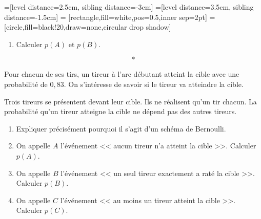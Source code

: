 \documentclass[10pt,french]{book}
\begin{document}
=[level distance=2.5cm, sibling distance=-3cm]
=[level distance=3.5cm, sibling distance=-1.5cm]
 = [rectangle,fill=white,pos=0.5,inner sep=2pt]
 = [circle,fill=black!20,draw=none,circular drop shadow]

\begin{center}
\end{center}

\begin{enumerate}[resume]
    \item Calculer $p(A)$ et $p(B)$.
\end{enumerate}\[*\]

\exo Pour chacun de ses tirs, un tireur à l'arc débutant atteint la cible avec une probabilité de $0,83$. On s'intéresse de savoir si le tireur va atteindre la cible.\par
Trois tireurs se présentent devant leur cible. Ils ne réalisent qu'un tir chacun. La probabilité qu'un tireur atteigne la cible ne dépend pas des autres tireurs.

\begin{enumerate}
    \item Expliquer précisément pourquoi il s'agit d'un schéma de Bernoulli.
    \item On appelle $A$ l'événement << aucun tireur n'a atteint la cible >>. Calculer $p(A)$.
    \item On appelle $B$ l'événement << un seul tireur exactement a raté la cible >>. Calculer $p(B)$.
    \item On appelle $C$ l'événement << au moins un tireur atteint la cible >>. Calculer $p(C)$.
\end{enumerate}
\end{document}
